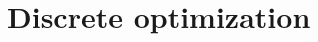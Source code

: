 \documentclass[bachelor,       %
               oneside,        %
               BCOR10mm,       %
               ngerman, english %
               ]{GAUBM}
\begin{document}









\section{Discrete optimization}
\end{document}
